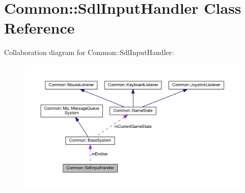 \hypertarget{class_common_1_1_sdl_input_handler}{}\section{Common\+:\+:Sdl\+Input\+Handler Class Reference}
\label{class_common_1_1_sdl_input_handler}


Collaboration diagram for Common\+:\+:Sdl\+Input\+Handler\+:\nopagebreak
\begin{figure}[H]
\begin{center}
\leavevmode
\includegraphics[width=350pt]{class_common_1_1_sdl_input_handler__coll__graph}
\end{center}
\end{figure}
